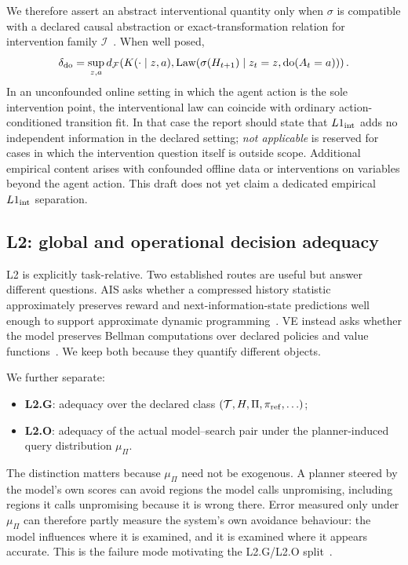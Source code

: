 \documentclass[10pt]{article}
\newcommand{\dF}{d_{\mathcal F}}
\begin{document}
We therefore assert an abstract interventional quantity only when $\sigma$ is compatible with a declared causal abstraction or exact-transformation relation for intervention family $\mathcal I$~\cite{rubenstein2017,beckers2019}. When well posed,
\[
\delta_{\rm do}
=
\sup_{z,a}
\dF\!\left(
K(\cdot\mid z,a),
\mathrm{Law}(\sigma(H_{t+1})\mid z_t=z,\mathrm{do}(A_t=a))
\right).
\]
In an unconfounded online setting in which the agent action is the sole intervention point, the interventional law can coincide with ordinary action-conditioned transition fit. In that case the report should state that $L1_{\rm int}$ adds no independent information in the declared setting; \emph{not applicable} is reserved for cases in which the intervention question itself is outside scope. Additional empirical content arises with confounded offline data or interventions on variables beyond the agent action. This draft does not yet claim a dedicated empirical $L1_{\rm int}$ separation.

\subsection{L2: global and operational decision adequacy}

L2 is explicitly task-relative. Two established routes are useful but answer different questions. AIS asks whether a compressed history statistic approximately preserves reward and next-information-state predictions well enough to support approximate dynamic programming~\cite{subramanian2022}. VE instead asks whether the model preserves Bellman computations over declared policies and value functions~\cite{grimm2020,grimm2021,grimm2022}. We keep both because they quantify different objects.

We further separate:
\begin{itemize}
    \item \textbf{L2.G}: adequacy over the declared class $(\mathcal T,H,\Pi,\pi_{\rm ref},\ldots)$;
    \item \textbf{L2.O}: adequacy of the actual model--search pair under the planner-induced query distribution $\mu_\Pi$.
\end{itemize}
The distinction matters because $\mu_\Pi$ need not be exogenous. A planner steered by the model's own scores can avoid regions the model calls unpromising, including regions it calls unpromising because it is wrong there. Error measured only under $\mu_\Pi$ can therefore partly measure the system's own avoidance behaviour: the model influences where it is examined, and it is examined where it appears accurate. This is the failure mode motivating the L2.G/L2.O split~\cite{he2024}.
\end{document}
